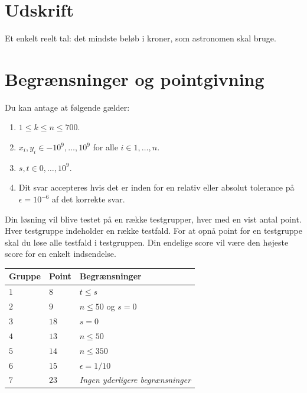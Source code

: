 \section*{Udskrift}

Et enkelt reelt tal: det mindste beløb i kroner, som astronomen skal bruge.

\section*{Begrænsninger og pointgivning}

Du kan antage at følgende gælder:
\begin{enumerate}
\item $1\leq k\leq n\leq 700$. %
\item $x_i, y_i\in {-10^9,\ldots, 10^9}$ for alle $i\in{1,\ldots,n}$. %
\item $s,t\in {0,\ldots, 10^9}$. %
\item Dit svar accepteres hvis det er inden for en relativ eller absolut tolerance på $\epsilon = 10^{-6}$ af det korrekte svar.
\end{enumerate}

Din løsning vil blive testet på en række testgrupper, hver med en vist antal point.
Hver testgruppe indeholder en række testfald.
For at opnå point for en testgruppe skal du løse alle testfald i testgruppen.
Din endelige score vil være den højeste score for en enkelt indsendelse.

\medskip
\noindent
\begin{tabular}{lll}
Gruppe & Point & Begrænsninger\\\hline
$1$ & $8$ & $t\leq s$\\
$2$ & $9$ & $n\leq 50$ og $s=0$\\
$3$ & $18$ & $s=0$\\
$4$ & $13$ & $n\leq 50$\\
$5$ & $14$ & $n\leq 350$\\
$6$ & $15$ & $\epsilon = 1/10$\\
$7$ & $23$ & \emph{Ingen yderligere begrænsninger}
\end{tabular}
